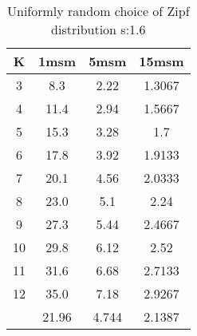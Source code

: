 \begin{table}[H]
\centering
\begin{tabular}{c|ccc}
K &1msm &5msm &15msm\\
\hline
3 & 8.3 & 2.22 & 1.3067\\
4 & 11.4 & 2.94 & 1.5667\\
5 & 15.3 & 3.28 & 1.7\\
6 & 17.8 & 3.92 & 1.9133\\
7 & 20.1 & 4.56 & 2.0333\\
8 & 23.0 & 5.1 & 2.24\\
9 & 27.3 & 5.44 & 2.4667\\
10 & 29.8 & 6.12 & 2.52\\
11 & 31.6 & 6.68 & 2.7133\\
12 & 35.0 & 7.18 & 2.9267\\
\hline
& 21.96 & 4.744 & 2.1387\\
\end{tabular}
\caption{Uniformly random choice of Zipf distribution s:1.6}
\label{tab:s1.6}
\end{table}
